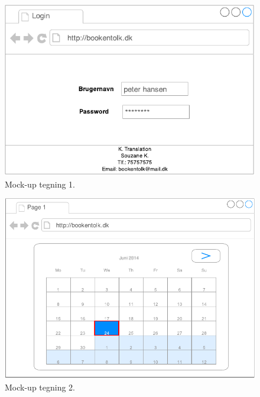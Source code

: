 \documentclass[12pt]{article}   %
\begin{document}
\begin{figure}[!ht]
\begin{center}
\includegraphics{mock1.pdf}
\caption{Mock-up tegning 1.}
\end{center}
\end{figure}


\newpage

\begin{figure}[!ht]
\begin{center}
\includegraphics{mock2.pdf}
\caption{Mock-up tegning 2.}
\end{center}
\end{figure}


\newpage
\end{document}
